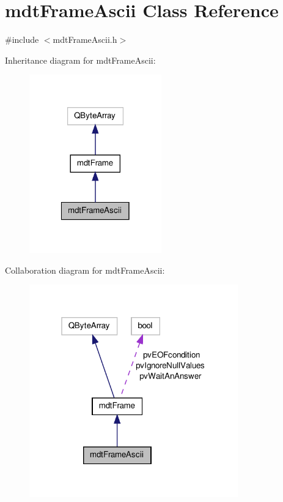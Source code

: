 \hypertarget{classmdt_frame_ascii}{\section{mdt\-Frame\-Ascii Class Reference}
\label{classmdt_frame_ascii}
}


{\ttfamily \#include $<$mdt\-Frame\-Ascii.\-h$>$}



Inheritance diagram for mdt\-Frame\-Ascii\-:
\nopagebreak
\begin{figure}[H]
\begin{center}
\leavevmode
\includegraphics[width=162pt]{classmdt_frame_ascii__inherit__graph}
\end{center}
\end{figure}


Collaboration diagram for mdt\-Frame\-Ascii\-:
\nopagebreak
\begin{figure}[H]
\begin{center}
\leavevmode
\includegraphics[width=256pt]{classmdt_frame_ascii__coll__graph}
\end{center}
\end{figure}
